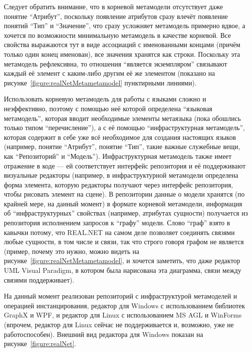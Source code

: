 \documentclass[a5paper]{article}
\begin{document}
Следует обратить внимание, что в корневой метамодели отсутствует даже понятие ``Атрибут'', поскольку появление атрибутов сразу влечёт появление понятий ``Тип'' и ``Значение'', что сразу усложняет метамодель примерно вдвое, а хочется по возможности минимальную метамодель в качестве корневой. Все свойства выражаются тут в виде ассоциаций с именованными концами (причём только один конец именован), все значения хранятся как строки. Поскольку эта метамодель рефлексивна, то отношения ``является экземпляром'' связывают каждый её элемент с каким-либо другим её же элементом (показано на рисунке~\ref{figure:realNetMetametamodel} пунктирными линиями).

Использовать корневую метамодель для работы с языками сложно и неэффективно, поэтому с помощью неё которой определена ``языковая метамодель'', которая вводит необходимые элементы метаязыка (пока обошлись только типом ``перечисление''), а с её помощью ``инфраструктурная метамодель'', которая содержит в себе уже всё необходимое для создания настоящих языков (например, понятие ``Атрибут'', понятие ``Тип'', такие важные служебные вещи, как ``Репозиторий'' и ``Модель''). Инфраструктурная метамодель также имеет отражение в коде --- ей соответствует интерфейс репозитория и её поддерживают визуальные редакторы (например, в инфраструктурной метамодели определена форма элемента, которую редакторы получают через интерфейс репозитория, чтобы рисовать элемент на сцене). В репозитории данные о модели хранятся (по крайней мере, на данный момент) в формате корневой метамодели, информация об ``инфраструктурных'' свойствах (например, атрибутах сущности) получается из репозитория исполнением запросов к ``графу'' модели. Слово ``граф'' взято в кавычки потому, что REAL.NET на самом деле позволяет соединять связями любые сущности, в том числе и связи, так что строго говоря графом не является (пример, почему это нужно, можно видеть на рисунке~\ref{figure:realNetMetametamodel}, и хочется заметить, что даже редактор UML Visual Paradigm, в котором была нарисована эта диаграмма, связи между связями поддерживает).

На данный момент реализован репозиторий с инфраструктурой метамоделей и операцией инстанцирования, редактор для Windows с использованием библиотек GraphX и WPF, и редактор для Linux с использованием MS AGL и WinForms (впрочем, редактор для Linux сейчас не поддерживается и, возможно, уже не работоспособен). Внешний вид редактора для Windows показан на рисунке~\ref{figure:realNet}.
\end{document}
